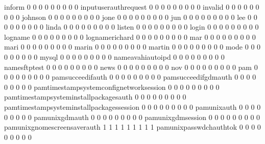 \documentclass[compress,8pt]{beamer}
\begin{document}
\begin{frame}
\begin{Schunk}
  inform                                     0   0   0   0   0   0   0   0   0
  inputuserauthrequest                       0   0   0   0   0   0   0   0   0
  invalid                                    0   0   0   0   0   0   0   0   0
  johnson                                    0   0   0   0   0   0   0   0   0
  jone                                       0   0   0   0   0   0   0   0   0
  jun                                        0   0   0   0   0   0   0   0   0
  lee                                        0   0   0   0   0   0   0   0   0
  linda                                      0   0   0   0   0   0   0   0   0
  listen                                     0   0   0   0   0   0   0   0   0
  login                                      0   0   0   0   0   0   0   0   0
  logname                                    0   0   0   0   0   0   0   0   0
  lognamerichard                             0   0   0   0   0   0   0   0   0
  mar                                        0   0   0   0   0   0   0   0   0
  mari                                       0   0   0   0   0   0   0   0   0
  marin                                      0   0   0   0   0   0   0   0   0
  martin                                     0   0   0   0   0   0   0   0   0
  mode                                       0   0   0   0   0   0   0   0   0
  mysql                                      0   0   0   0   0   0   0   0   0
  nameavahiautoipd                           0   0   0   0   0   0   0   0   0
  namesftptest                               0   0   0   0   0   0   0   0   0
  news                                       0   0   0   0   0   0   0   0   0
  nov                                        0   0   0   0   0   0   0   0   0
  pam                                        0   0   0   0   0   0   0   0   0
  pamsucceedifauth                           0   0   0   0   0   0   0   0   0
  pamsucceedifgdmauth                        0   0   0   0   0   0   0   0   0
  pamtimestampsystemconfignetworksession     0   0   0   0   0   0   0   0   0
  pamtimestampsysteminstallpackagesauth      0   0   0   0   0   0   0   0   0
  pamtimestampsysteminstallpackagessession   0   0   0   0   0   0   0   0   0
  pamunixauth                                0   0   0   0   0   0   0   0   0
  pamunixgdmauth                             0   0   0   0   0   0   0   0   0
  pamunixgdmsession                          0   0   0   0   0   0   0   0   0
  pamunixgnomescreensaverauth                1   1   1   1   1   1   1   1   1
  pamunixpasswdchauthtok                     0   0   0   0   0   0   0   0   0

\end{Schunk}
\end{frame}
\end{document}
